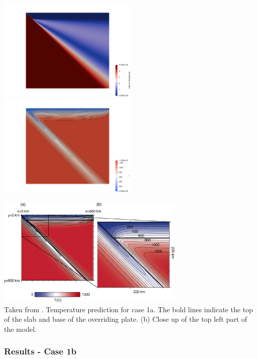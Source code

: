 \begin{center}
\includegraphics[width=6.7cm]{python_codes/fieldstone_68/results/case1a/vel_1a}
\includegraphics[width=6.7cm]{python_codes/fieldstone_68/results/case1a/T_1a}
\end{center}

\begin{center}
\includegraphics[width=9cm]{python_codes/fieldstone_68/images/fig2}\\
{\captionfont Taken from \cite{vack08}. Temperature prediction for case 1a. 
The bold lines indicate the top of the slab and base of the overriding plate. 
(b) Close up of the top left part of the model.}
\end{center}


\newpage
\subsubsection*{Results - Case 1b}

